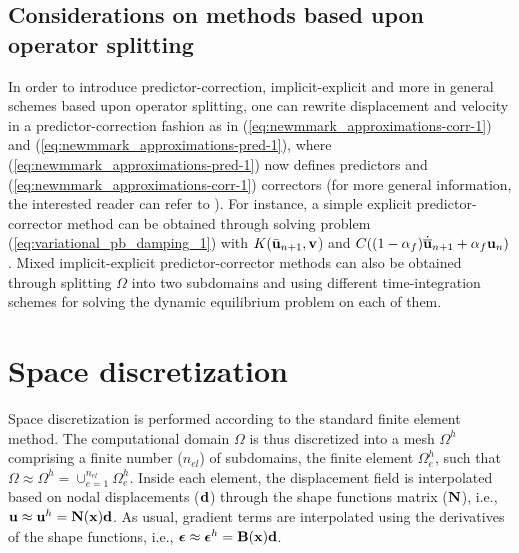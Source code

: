 \documentclass{report}
\newcommand{\bx}{\textbf{x}}
\newcommand{\bu}{\textbf{u}}
\newcommand{\bv}{\textbf{v}}
\def\bepsilon{\mbox{\boldmath${\epsilon}$}}
\def\bB{{\bf B}}
\def\bd{{\bf d}}
\def\bN{{\bf N}}
\def\bx{{\bf{x}}}
\def\bu{{\bf{u}}}
\def\bv{{\bf{v}}}
\begin{document}
\subsection{Considerations on methods based upon operator splitting}

In order to introduce predictor-correction, implicit-explicit and
more in general schemes based upon operator splitting, one can rewrite
displacement and velocity in a predictor-correction fashion as in
(\ref{eq:newmmark_approximations-corr-1}) and (\ref{eq:newmmark_approximations-pred-1}),
where (\ref{eq:newmmark_approximations-pred-1}) now defines predictors
and (\ref{eq:newmmark_approximations-corr-1}) correctors (for more general information, the interested reader can refer to \cite{hughes2012finite,zienkiewicz1994finite}). For
instance, a simple explicit predictor-corrector method can be obtained
through solving problem (\ref{eq:variational_pb_damping_1}) with
$K(\bar{\bu}_{n+1},\bv$) and $C((1-\alpha_{f})\dot{\overline{\bu}}_{n+1}+\alpha_{f}\bu_{n})$.
Mixed implicit-explicit predictor-corrector methods can also be obtained
through splitting $\Omega$ into two subdomains and using different
time-integration schemes for solving the dynamic equilibrium problem
on each of them.

\section{Space discretization}

Space discretization is performed according to the standard finite
element method. The computational domain $\Omega$ is thus discretized
into a mesh $\Omega^{h}$ comprising a finite number ($n_{el}$) of
subdomains, the finite element $\Omega_{e}^{h}$, such that $\Omega\approx\Omega^{h}=\cup_{e=1}^{n_{el}}\Omega_{e}^{h}$.
Inside each element, the displacement field is interpolated based
on nodal displacements ($\bd$) through the shape functions matrix
($\bN$), i.e., $\bu\approx\bu^{h}=\bN(\bx)\bd$. As usual, gradient
terms are interpolated using the derivatives of the shape functions,
i.e., $\bepsilon\approx\bepsilon^{h}=\bB(\bx)\bd$.
\end{document}
